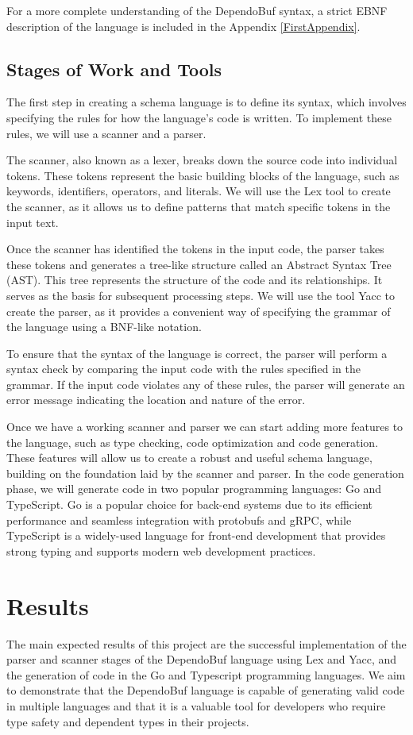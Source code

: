 \documentclass[conference]{IEEEtran}
\begin{document}
    For a more complete understanding of the DependoBuf syntax, a strict EBNF description of the language is included in the Appendix \ref{FirstAppendix}.

\subsection{Stages of Work and Tools}
The first step in creating a schema language is to define its syntax, which involves specifying the rules for how the language's code is written. To implement these rules, we will use a scanner and a parser.

The scanner, also known as a lexer, breaks down the source code into individual tokens. These tokens represent the basic building blocks of the language, such as keywords, identifiers, operators, and literals. We will use the Lex tool to create the scanner, as it allows us to define patterns that match specific tokens in the input text.

Once the scanner has identified the tokens in the input code, the parser takes these tokens and generates a tree-like structure called an Abstract Syntax Tree (AST). This tree represents the structure of the code and its relationships. It serves as the basis for subsequent processing steps. We will use the tool Yacc to create the parser, as it provides a convenient way of specifying the grammar of the language using a BNF-like notation.

To ensure that the syntax of the language is correct, the parser will perform a syntax check by comparing the input code with the rules specified in the grammar. If the input code violates any of these rules, the parser will generate an error message indicating the location and nature of the error.

Once we have a working scanner and parser we can start adding more features to the language, such as type checking, code optimization and code generation. These features will allow us to create a robust and useful schema language, building on the foundation laid by the scanner and parser. In the code generation phase, we will generate code in two popular programming languages: Go and TypeScript. Go is a popular choice for back-end systems due to its efficient performance and seamless integration with protobufs and gRPC, while TypeScript is a widely-used language for front-end development that provides strong typing and supports modern web development practices.

\section{Results}
The main expected results of this project are the successful implementation of the parser and scanner stages of the DependoBuf language using Lex and Yacc, and the generation of code in the Go and Typescript programming languages. We aim to demonstrate that the DependoBuf language is capable of generating valid code in multiple languages and that it is a valuable tool for developers who require type safety and dependent types in their projects.
\end{document}
